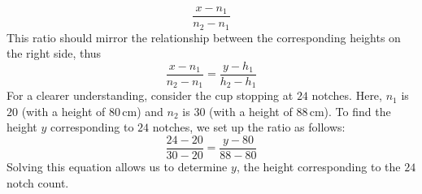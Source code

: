\documentclass{report}
\begin{document}
    \begin{equation}
        \frac{x-n_1}{n_2-n_1}
    \end{equation}
    \bigbreak \noindent
    This ratio should mirror the relationship between the corresponding heights on the right side, thus
    \begin{equation}
        \frac{x-n_1}{n_2-n_1}=\frac{y-h_1}{h_2-h_1}
    \end{equation}
    \bigbreak \noindent
    For a clearer understanding, consider the cup stopping at $24$ notches. Here, $n_1$ is $20$ (with a height of $80 \, \mathrm{cm}$) and $n_2$ is $30$ (with a height of $88 \, \mathrm{cm}$). To find the height $y$ corresponding to $24$ notches, we set up the ratio as follows:
    \begin{equation}
        \frac{24-20}{30-20}=\frac{y-80}{88-80}
    \end{equation}
    Solving this equation allows us to determine $y$, the height corresponding to the $24$ notch count.


    \bigbreak \noindent 
\end{document}
